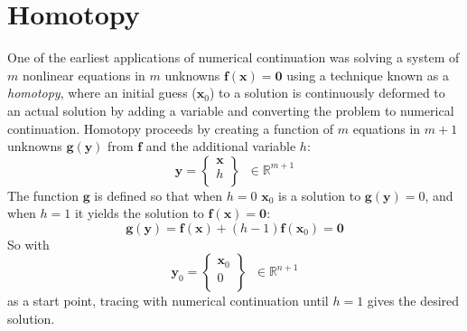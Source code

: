 \documentclass[10pt,openany,twoside]{book}
\numberwithin{equation}{section}   %
\newcommand{\Newterm}[1]{{\em #1}}
\newcommand{\Vector}[1]{\boldsymbol{#1}}
\begin{document}
\section{Homotopy}\label{sect:homotopy}
One of the earliest applications of numerical continuation was solving a system
of $m$ nonlinear equations in $m$ unknowns
$\Vector{f}(\Vector{x})=\Vector{0}$ using a
technique known as a \Newterm{homotopy},
where an initial guess ($\Vector{x}_0$) to a solution is continuously
deformed to an actual solution by adding a variable and converting the
problem to numerical continuation.
Homotopy proceeds by creating a function of $m$ equations in $m+1$
unknowns
$\Vector{g}(\Vector{y})$
from 
$\Vector{f}$ and the additional variable $h$:
\begin{equation}
\Vector{y} = \left\{\begin{array}{c}
	\Vector{x} \\
	h \\
\end{array} \right\} \;\; \in \mathbb{R}^{m+1} \nonumber
\end{equation}
The function $\Vector{g}$ is defined so that when $h = 0$
$\Vector{x}_0$
is a solution to $\Vector{g}(\Vector{y})=0$, and when $h = 1$ it
yields the solution to $\Vector{f}(\Vector{x}) = \Vector{0}$:
\begin{equation*}
\Vector{g}(\Vector{y}) = \Vector{f}(\Vector{x})
	+ (h - 1)\Vector{f}(\Vector{x}_0) = \Vector{0}
\end{equation*}
So with
\begin{equation}
\Vector{y}_0 = \left\{\begin{array}{c}
\Vector{x}_0 \\
0 \\
\end{array} \right\} \;\; \in \mathbb{R}^{n+1} \nonumber
\end{equation}
as a start point, tracing with numerical continuation until
$h=1$ gives the desired solution.
\end{document}
